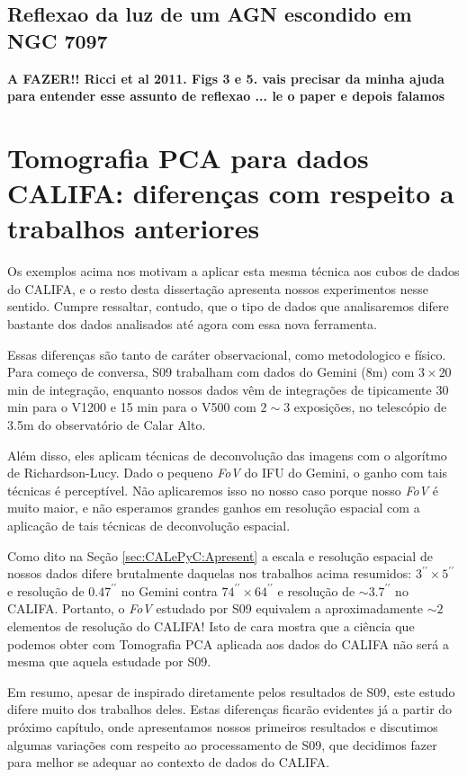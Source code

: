 \subsection{Reflexao da luz de um AGN escondido em NGC 7097}

{\bf\ojo A FAZER!! Ricci et al 2011. Figs 3 e 5. vais precisar da minha ajuda para entender esse assunto de
reflexao ... le o paper e depois falamos}

\section{Tomografia PCA para dados CALIFA: diferen\c{c}as com respeito a trabalhos anteriores}

Os exemplos acima nos motivam a aplicar esta mesma técnica aos cubos de dados do CALIFA, e o resto desta dissertação
apresenta nossos experimentos nesse sentido. Cumpre ressaltar, contudo, que o tipo de dados que analisaremos difere
bastante dos dados analisados até agora com essa nova ferramenta.

Essas diferenças são tanto de caráter observacional, como metodologico e físico. Para começo de conversa, S09 trabalham
com dados do Gemini (8m) com $3 \times 20$ min de integração, enquanto nossos dados vêm de integrações de tipicamente
30 min para o V1200 e 15 min para o V500 com $2\sim3$ exposições, no telescópio de 3.5m do observatório de Calar Alto.

Além disso, eles aplicam técnicas de deconvolução das imagens com o algorítmo de Richardson-Lucy. Dado o pequeno {\em
FoV} do IFU do Gemini, o ganho com tais técnicas é perceptível. Não aplicaremos isso no nosso caso porque nosso {\em
FoV} é muito maior, e não esperamos grandes ganhos em resolução espacial com a aplicação de tais técnicas de
deconvolução espacial.

Como dito na Seção \ref{sec:CALePyC:Apresent} a escala e resolução espacial de nossos dados difere brutalmente daquelas
nos trabalhos acima resumidos: $3^{\prime\prime} \times 5^{\prime\prime}$ e resolução de $0.47^{\prime\prime}$ no Gemini
contra $74^{\prime\prime} \times 64^{\prime\prime}$ e resolução de $\sim3.7^{\prime\prime}$ no CALIFA. Portanto, o {\em
FoV} estudado por S09 equivalem a aproximadamente $\sim2$ elementos de resolução do CALIFA! Isto de cara mostra que a
ciência que podemos obter com Tomografia PCA aplicada aos dados do CALIFA não será a mesma que aquela estudade por S09.

Em resumo, apesar de inspirado diretamente pelos resultados de S09, este estudo difere muito dos trabalhos deles. Estas
diferenças ficarão evidentes já a partir do próximo capítulo, onde apresentamos nossos primeiros resultados e discutimos
algumas variações com respeito ao processamento de S09, que decidimos fazer para melhor se adequar ao contexto de dados
do CALIFA.

